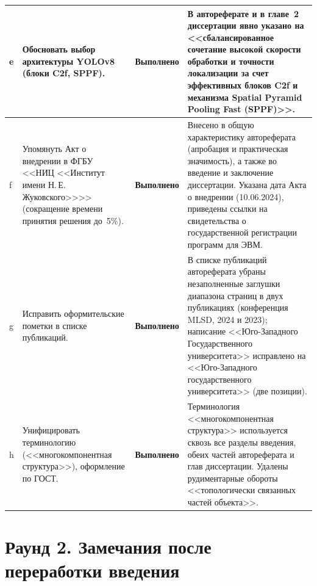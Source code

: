 \documentclass[a4paper,11pt]{article}
\newcommand{\statusDone}{{\color{statusDone}\textbf{Выполнено}}}
\begin{document}
\begin{longtable}{@{}p{}p{}p{}p{}@{}}
e & Обосновать выбор архитектуры YOLOv8 (блоки C2f, SPPF).
& \statusDone
& В автореферате и в главе~2 диссертации явно указано на <<сбалансированное сочетание высокой скорости обработки и точности локализации за счет эффективных блоков C2f и механизма Spatial Pyramid Pooling Fast (SPPF)>>.\\
\midrule

f & Упомянуть Акт о внедрении в ФГБУ <<НИЦ <<Институт имени Н.\,Е.\,Жуковского>>>> (сокращение времени принятия решения до~5\%).
& \statusDone
& Внесено в общую характеристику автореферата (апробация и практическая значимость), а также во введение и заключение диссертации. Указана дата Акта о внедрении (10.06.2024), приведены ссылки на свидетельства о государственной регистрации программ для ЭВМ.\\
\midrule

g & Исправить оформительские пометки в списке публикаций.
& \statusDone
& В списке публикаций автореферата убраны незаполненные заглушки диапазона страниц в двух публикациях (конференция MLSD, 2024 и 2023); написание <<Юго-Западного Государственного университета>> исправлено на <<Юго-Западного государственного университета>> (две позиции).\\
\midrule

h & Унифицировать терминологию (<<многокомпонентная структура>>), оформление по ГОСТ.
& \statusDone
& Терминология <<многокомпонентная структура>> используется сквозь все разделы введения, обеих частей автореферата и глав диссертации. Удалены рудиментарные обороты <<топологически связанных частей объекта>>.\\
\end{longtable}

\vspace{4pt}

\section*{Раунд 2. Замечания после переработки введения}
\end{document}
